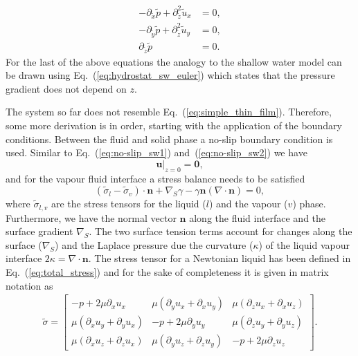 \begin{align}
    -\partial_{\tilde{x}}\tilde{p} + \partial^2_{\tilde{z}}\tilde{u}_x &= 0,  \label{eq:thin_film_pressure_x}\\
    -\partial_{\tilde{y}}\tilde{p} + \partial^2_{\tilde{z}}\tilde{u}_y &= 0,  \label{eq:thin_film_pressure_y}\\
    \partial_{\tilde{z}}\tilde{p} &= 0. \label{eq:thin_film_pressure_z}
\end{align}
For the last of the above equations the analogy to the shallow water model can be drawn using Eq.~(\ref{eq:hydrostat_sw_euler}) which states that the pressure gradient does not depend on $z$.
 
The system so far does not resemble Eq.~(\ref{eq:simple_thin_film}).
Therefore, some more derivation is in order, starting with the application of the boundary conditions.
Between the fluid and solid phase a no-slip boundary condition is used. 
Similar to Eq.~(\ref{eq:no-slip_sw1}) and~(\ref{eq:no-slip_sw2}) we have
\begin{equation}\label{eq:thin_all_v_noslip}
    \mathbf{u}|_{z=0} = \mathbf{0},    
\end{equation}
and for the vapour fluid interface a stress balance needs to be satisfied~\cite{lealAdvancedTransportPhenomena2007}
\begin{equation}\label{eq:thin_film_upper_bc}
    (\tilde{\sigma}_l - \tilde{\sigma}_v)\cdot\mathbf{n} + \nabla_S\gamma - \gamma\mathbf{n}(\nabla\cdot\mathbf{n}) = 0,
\end{equation}
where $\tilde{\sigma}_{l,v}$ are the stress tensors for the liquid ($l$) and the vapour ($v$) phase. 
Furthermore, we have the normal vector $\mathbf{n}$ along the fluid interface and the surface gradient $\nabla_S$.
The two surface tension terms account for changes along the surface ($\nabla_S$) and the Laplace pressure due the curvature ($\kappa$) of the liquid vapour interface $2\kappa = \nabla\cdot\mathbf{n}$.
The stress tensor for a Newtonian liquid has been defined in Eq.~(\ref{eq:total_stress}) and for the sake of completeness it is given in matrix notation as 
\begin{gather}\label{eq:stress_matrix}
    \tilde{\sigma} = \begin{bmatrix}
    -p + 2\mu\partial_x u_x & \mu(\partial_y u_x + \partial_x u_y) & \mu(\partial_z u_x + \partial_x u_z) \\
    \mu(\partial_x u_y + \partial_y u_x) & -p + 2\mu\partial_y u_y & \mu(\partial_z u_y + \partial_y u_z) \\
    \mu(\partial_x u_z + \partial_z u_x) & \mu(\partial_y u_z + \partial_z u_y) & -p + 2\mu\partial_z u_z   
    \end{bmatrix} .
\end{gather}
